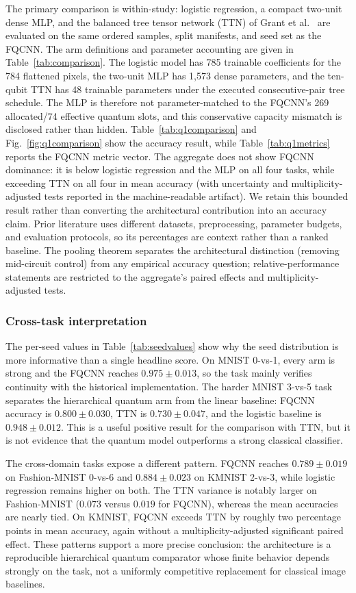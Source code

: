 \documentclass[conference]{IEEEtran}
\begin{document}
The primary comparison is within-study: logistic regression, a compact two-unit dense MLP, and the balanced tree tensor network (TTN) of Grant et al.~\cite{ref46} are evaluated on the same ordered samples, split manifests, and seed set as the FQCNN. The arm definitions and parameter accounting are given in Table~\ref{tab:comparison}. The logistic model has 785 trainable coefficients for the 784 flattened pixels, the two-unit MLP has 1,573 dense parameters, and the ten-qubit TTN has 48 trainable parameters under the executed consecutive-pair tree schedule. The MLP is therefore not parameter-matched to the FQCNN's 269 allocated/74 effective quantum slots, and this conservative capacity mismatch is disclosed rather than hidden. Table~\ref{tab:q1comparison} and Fig.~\ref{fig:q1comparison} show the accuracy result, while Table~\ref{tab:q1metrics} reports the FQCNN metric vector. The aggregate does not show FQCNN dominance: it is below logistic regression and the MLP on all four tasks, while exceeding TTN on all four in mean accuracy (with uncertainty and multiplicity-adjusted tests reported in the machine-readable artifact). We retain this bounded result rather than converting the architectural contribution into an accuracy claim. Prior literature uses different datasets, preprocessing, parameter budgets, and evaluation protocols, so its percentages are context rather than a ranked baseline. The pooling theorem separates the architectural distinction (removing mid-circuit control) from any empirical accuracy question; relative-performance statements are restricted to the aggregate's paired effects and multiplicity-adjusted tests.

\subsubsection{Cross-task interpretation}
The per-seed values in Table~\ref{tab:seedvalues} show why the seed distribution is
more informative than a single headline score. On MNIST 0-vs-1, every arm is
strong and the FQCNN reaches $0.975\pm0.013$, so the task mainly verifies
continuity with the historical implementation. The harder MNIST 3-vs-5 task
separates the hierarchical quantum arm from the linear baseline: FQCNN accuracy
is $0.800\pm0.030$, TTN is $0.730\pm0.047$, and the logistic baseline is
$0.948\pm0.012$. This is a useful positive result for the comparison with TTN,
but it is not evidence that the quantum model outperforms a strong classical
classifier.

The cross-domain tasks expose a different pattern. FQCNN reaches
$0.789\pm0.019$ on Fashion-MNIST 0-vs-6 and $0.884\pm0.023$ on KMNIST 2-vs-3,
while logistic regression remains higher on both. The TTN variance is notably
larger on Fashion-MNIST ($0.073$ versus $0.019$ for FQCNN), whereas the mean
accuracies are nearly tied. On KMNIST, FQCNN exceeds TTN by roughly two
percentage points in mean accuracy, again without a multiplicity-adjusted
significant paired effect. These patterns support a more precise conclusion:
the architecture is a reproducible hierarchical quantum comparator whose
finite behavior depends strongly on the task, not a uniformly competitive
replacement for classical image baselines.
\end{document}
